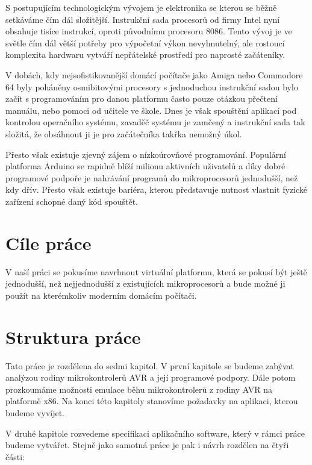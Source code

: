 \begin{introduction}

S postupujícím technologickým vývojem je elektronika se kterou se běžně setkáváme čím dál složitější. Instrukční sada procesorů od firmy Intel nyní obsahuje tisíce instrukcí\cite{x86-instructions}, oproti původnímu procesoru 8086\cite{8086-instructions}. Tento vývoj je ve světle čím dál větší potřeby pro výpočetní výkon nevyhnutelný, ale rostoucí komplexita hardwaru vytváří nepřátelské prostředí pro naprosté začáteníky.

V dobách, kdy nejsofistikovanější domácí počítače jako Amiga nebo Commodore 64 byly poháněny osmibitovými procesory s jednoduchou instrukční sadou bylo začít s programováním pro danou platformu často pouze otázkou přečtení manuálu, nebo pomoci od učitele ve škole. Dnes je však spouštění aplikací pod kontrolou operačního systému, zavaděč systému je zamčený a instrukční sada tak složitá, že obsáhnout ji je pro začátečníka takřka nemožný úkol.

Přesto však existuje zjevný zájem o nízkoúrovňové programování. Populární platforma Arduino se rapidně blíží milionu aktivních uživatelů a díky dobré programové podpoře je nahrávání programů do mikroprocesorů jednodušší, než kdy dřív. Přesto však existuje bariéra, kterou představuje nutnost vlastnit fyzické zařízení schopné daný kód spouštět.

\section{Cíle práce}

V naší práci se pokusíme navrhnout virtuální platformu, která se pokusí být ještě jednodušší, než nejjednodušší z existujících mikroprocesorů a bude možné ji použít na kterémkoliv moderním domácím počítači.


\section{Struktura práce}

Tato práce je rozdělena do sedmi kapitol. V první kapitole se budeme zabývat analýzou rodiny mikrokontrolerů AVR\cite{avr} a její programové podpory. Dále potom prozkoumáme možnosti emulace běhu mikrokontrolerů z rodiny AVR na platformě x86. Na konci této kapitoly stanovíme požadavky na aplikaci, kterou budeme vyvíjet.

V druhé kapitole rozvedeme specifikaci aplikačního software, který v rámci práce budeme vytvářet. Stejně jako samotná práce je pak i návrh rozdělen na čtyři části:


\end{introduction}

